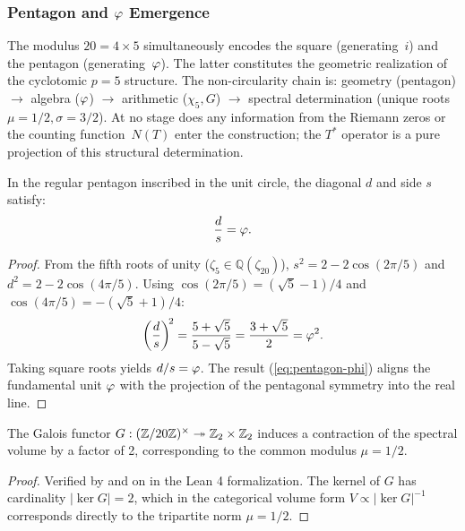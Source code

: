 \subsubsection{Pentagon and \texorpdfstring{$\varphi$}{phi} Emergence}

The modulus $20=4\times 5$ simultaneously encodes the square (generating~$i$) 
and the pentagon (generating~$\varphi$). The latter constitutes the 
geometric realization of the cyclotomic $p=5$ structure. The 
non-circularity chain is: geometry (pentagon) $\to$ algebra ($\varphi$) 
$\to$ arithmetic ($\chi_5, G$) $\to$ spectral determination (unique roots 
$\mu = 1/2, \sigma = 3/2$). At no stage does any information from the 
Riemann zeros or the counting function~$N(T)$ enter the construction; 
the $T^*$ operator is a pure projection of this structural determination.

\begin{Proposition}\label{prop:pentagon-phi}
In the regular pentagon inscribed in the unit circle, the diagonal $d$ and
side $s$ satisfy:
\begin{equation}\label{eq:pentagon-phi}
  \frac{d}{s} = \varphi.
\end{equation}
\end{Proposition}

\begin{proof}
From the fifth roots of unity ($\zeta_5 \in \mathbb{Q}(\zeta_{20})$), 
$s^2 = 2 - 2\cos(2\pi/5)$ and $d^2 = 2 - 2\cos(4\pi/5)$. Using 
$\cos(2\pi/5) = (\sqrt{5}-1)/4$ and $\cos(4\pi/5) = -(\sqrt{5}+1)/4$:
\begin{equation}\label{eq:pentagon-phi-derivation}
  \left(\frac{d}{s}\right)^{\!2}
    = \frac{5+\sqrt{5}}{5-\sqrt{5}}
    = \frac{3+\sqrt{5}}{2} = \varphi^2.
\end{equation}
Taking square roots yields $d/s = \varphi$. The result (\cref{eq:pentagon-phi}) aligns the fundamental unit $\varphi$ with the projection of the pentagonal symmetry into the real line.
\end{proof}

\begin{Proposition}\label{prop:galois-contraction}
The Galois functor $G: (\mathbb{Z}/20\mathbb{Z})^\times \twoheadrightarrow \mathbb{Z}_2 \times \mathbb{Z}_2$ 
induces a contraction of the spectral volume by a factor of 2, 
corresponding to the common modulus $\mu = 1/2$.
\end{Proposition}

\begin{proof}
Verified by  and  on 
 in the Lean 4 formalization. The kernel of $G$ has 
cardinality $|\ker G| = 2$, which in the categorical volume form 
$V \propto |\ker G|^{-1}$ corresponds directly to the tripartite 
norm $\mu = 1/2$.
\end{proof}

